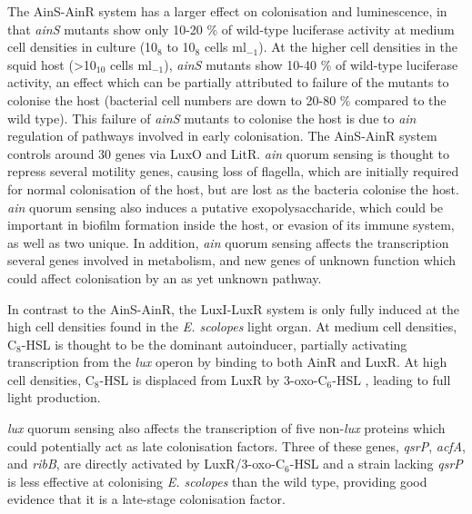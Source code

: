 The AinS-AinR system has a larger effect on colonisation and luminescence, in that \textit{ainS} mutants show only 10-20 \% of wild-type luciferase activity at medium cell densities in culture (10$_8$ to 10$_8$ cells ml$_{-1}$)\cite{Lupp2003}. At the higher cell densities in the squid host (>10$_{10}$ cells ml$_{-1}$), \textit{ainS} mutants show 10-40 \% of wild-type luciferase activity, an effect which can be partially attributed to failure of the mutants to colonise the host (bacterial cell numbers are down to 20-80 \% compared to the wild type).
This failure of \textit{ainS} mutants to colonise the host is due to \textit{ain} regulation of pathways involved in early colonisation. The AinS-AinR system controls around 30 genes via LuxO and LitR\cite{Lupp2005}. \textit{ain} quorum sensing is thought to repress several motility genes, causing loss of flagella, which are initially required for normal colonisation of the host\cite{Millikan2002a,Graf1994}, but are lost as the bacteria colonise the host\cite{Ruby1993}. 
\textit{ain} quorum sensing also induces a putative exopolysaccharide, which could be important in biofilm formation inside the host, or evasion of its immune system\cite{Roberts1996}, as well as two unique.
In addition, \textit{ain} quorum sensing affects the transcription several genes involved in metabolism, and new genes of unknown function which could affect colonisation by an as yet unknown pathway.

In contrast to the AinS-AinR, the LuxI-LuxR system is only fully induced at the high cell densities found in the \textit{E. scolopes} light organ. At medium cell densities, C$_8$-HSL  is thought to be the dominant autoinducer, partially activating transcription from the \textit{lux} operon by binding to both AinR and LuxR\cite{Lupp2003}. At high cell densities, C$_8$-HSL  is displaced from LuxR by 3-oxo-C$_6$-HSL , leading to full light production.

\textit{lux} quorum sensing also affects the transcription of five non-\textit{lux} proteins which could potentially act as late colonisation factors\cite{Callahan2000,Qin2007}. Three of these genes, \textit{qsrP}, \textit{acfA}, and \textit{ribB}, are directly activated by LuxR/3-oxo-C$_6$-HSL\cite{Qin2007} and a strain lacking \textit{qsrP} is less effective at colonising \textit{E. scolopes} than the wild type, providing good evidence that it is a late-stage colonisation factor\cite{Callahan2000}.



